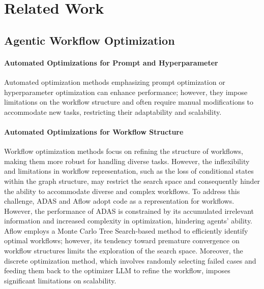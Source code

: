 \section{Related Work}
\subsection{Agentic Workflow Optimization}




\paragraph{Automated Optimizations for Prompt and Hyperparameter} 
 
Automated optimization methods emphasizing prompt optimization \citep{fernando2023promptbreeder, yuksekgonul2024textgrad, yang2023large, khattab2024dspy} or hyperparameter optimization \citep{saad2024archon} can enhance performance; however, they impose limitations on the workflow structure and often require manual modifications to accommodate new tasks, restricting their adaptability and scalability.

\paragraph{Automated Optimizations for Workflow Structure} Workflow optimization methods \citep{zhou2024symbolic, zhuge2023mindstorms, hu2024automated, zhang2024aflow, chen2023autoagents, li2024autoflow, liu2024dynamic, song2024adaptive, zhang2024g} focus on refining the structure of workflows, making them more robust for handling diverse tasks.
However, the inflexibility and limitations in workflow representation, such as the loss of conditional states within the graph structure, may restrict the search space and consequently hinder the ability to accommodate diverse and complex workflows.
To address this challenge, ADAS \citep{hu2024automated} and Aflow \citep{zhang2024aflow} adopt code as a representation for workflows.
However, the performance of ADAS is constrained by its accumulated irrelevant information and increased complexity in optimization, hindering agents' ability. Aflow employs a Monte Carlo Tree Search-based method to efficiently identify optimal workflows; however, its tendency toward premature convergence on workflow structures limits the exploration of the search space. Moreover, the discrete optimization method, which involves randomly selecting failed cases and feeding them back to the optimizer LLM to refine the workflow, imposes significant limitations on scalability.






